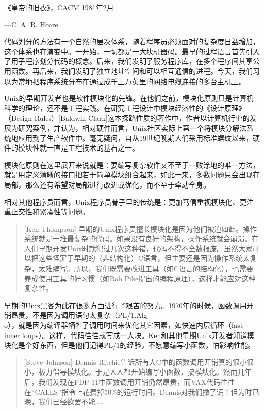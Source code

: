 \documentclass[12pt,oneside]{book}
\begin{document}
\begin{common-format}
\begin{flushright}
\begin{notecard}{30em}
{\hfill 《皇帝的旧衣》，CACM 1981年2月}

{\hfill —C. A. R. Hoare}
\end{notecard}
\end{flushright}

代码划分的方法有一个自然的层次体系，随着程序员必须面对的复杂度日益增加，这个体系也在演变中。一开始，一切都是一大块机器码。最早的过程语言首先引入了用子程序划分代码的概念。后来，我们发明了服务程序库，在多个程序间其享公用函数。再后来，我们发明了独立地址空间和可以相互通信的进程。今天，我们习以为常地把程序系统分布在通过成千上万英里的网络电缆连接的多台主机上。

Unix的早期开发者也是软件模块化的先锋。在他们之前，模块化原则只是计算机科学的理论，还不是工程实践。在研究工程设计中模块经济性的《设计原理》（Design Rules）[Baldwin-Clark]这本探路性质的著作中，作者以计算机行业的发展为研究案例，并认为，相对硬件而言，Unix社区实际上第一个将模块分解法系统地应用到了生产软件中。毫无疑问，自从19世纪晚期人们采用标准螺纹以来，硬件的模块性就一直是工程技术的基石之一。

模块化原则在这里展开来说就是：要编写复杂软件又不至于一败涂地的唯一方法，就是用定义清晰的接口把若干简单模块组合起来，如此一来，多数问题只会出现在局部，那么还有希望对局部进行改进或优化，而不至于牵动全身。

相对其他程序员而言，Unix程序员骨子里的传统是：更加笃信重视模块化、更注重正交性和紧凑性等问题。
\begin{quote}[Ken Thompson]
早期的Unix程序员擅长模块化是因为他们被迫如此。操作系统就是一堆最复杂的代码。如果没有良好的架构，操作系统就会崩溃。在人们早期开发Unix时就犯过几次这种错，代码不得不全数报废。虽然大家可以把这些怪罪于早期的（非结构化）C语言，但主要还是因为操作系统太复杂，太难编写。所以，我们既需要改进工具（如C语言的结构化），也需要养成使用工具的好习惯（如Rob Pike提出的编程原理），这样才能应对这种复杂性。
\end{quote}

早期的Unix黑客为此在很多方面进行了艰苦的努力。1970年的时候，函数调用开销昂贵，不是因为调用语句太复杂（PL/1.Alg-\\o），就是因为编译器牺牲了调用时间来优化其它因素，如快速内层循环（fast inner loops）。这样，代码往往就写成一大块。Ken和其他早期Unix开发者知道模块化是个好东西，但是他们记得PL/1的经验，不愿意编写小函数，怕影响性能。
\begin{quote}[Steve Johnson]
Dennis Ritchie告诉所有人C中的函数调用开销真的很小很小，极力倡导模块化。于是人人都开始编写小函数，搞模块化。然而几年后，我们发现在PDP-11中函数调用开销仍然昂贵，而VAX代码往往在“CALLS”指令上花费掉50\%的运行时间。Dennis对我们撒了谎！但为时已晚，我们已经欲罢不能……
\end{quote}


\end{common-format}
\end{document}
